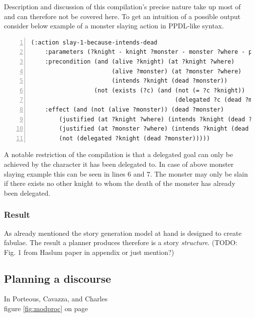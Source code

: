 Description and discussion of this compilation's precise nature take up most of \cite{Haslum14} and can therefore not be covered here. To get an intuition of a possible output consider below example of a monster slaying action in PPDL-like syntax.
\begin{lstlisting}[frame=single,basicstyle=\scriptsize,numbers=left,numberstyle=\tiny]
(:action slay-1-because-intends-dead
    :parameters (?knight - knight ?monster - monster ?where - place)
    :precondition (and (alive ?knight) (at ?knight ?where)
                       (alive ?monster) (at ?monster ?where)
                       (intends ?knight (dead ?monster))
                  (not (exists (?c) (and (not (= ?c ?knight))
                                         (delegated ?c (dead ?monster))))))
    :effect (and (not (alive ?monster)) (dead ?monster)
        (justified (at ?knight ?where) (intends ?knight (dead ?monster)))
        (justified (at ?monster ?where) (intends ?knight (dead ?monster)))
        (not (delegated ?knight (dead ?monster)))))
\end{lstlisting}
A notable restriction of the compilation is that a delegated goal can only be achieved by the character it has been delegated to. In case of above monster slaying example this can be seen in lines 6 and 7. The monster may only be slain if there exists no other knight to whom the death of the monster has already been delegated.
\subsubsection{Result}
As already mentioned the story generation model at hand is designed to create fabulae. The result a planner produces therefore is a story \emph{structure}. (TODO: Fig. 1 from Haslum paper in appendix or just mention?)

\subsection{Planning a discourse}\label{discourse}
In \cite{Porteous10} Porteous, Cavazza, and Charles\\
figure \ref{fig:modproc} on page \pageref{fig:modproc}
